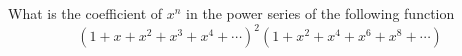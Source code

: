 What is the coefficient of $x^n$ in the power series
of the following function 
\[
(1 + x + x^2 + x^3 + x^4 + \cdots)^2
(1 + x^2 + x^4 + x^6 + x^8 + \cdots)
\]
